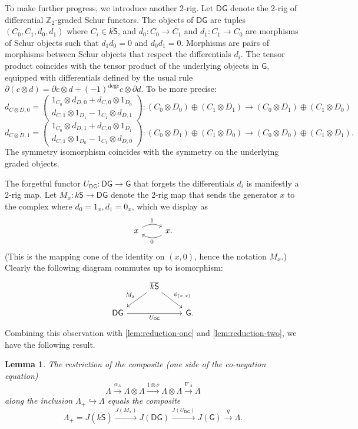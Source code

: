 \documentclass[12pt,reqno]{amsart}
\theoremstyle{plain}
\newtheorem{lem}[thm]{Lemma}
\theoremstyle{definition}
\theoremstyle{remark}
\newcommand{\maps}{\colon}
\newcommand{\category}[1]{\mathsf{#1}}
\renewcommand{\S}{\category S}
\newcommand{\Z}{\mathbb Z}
\newcommand{\G}{\mathsf{G}} %
\newcommand{\DG}{\mathsf{DG}} %
\newcommand{\ksbar}{\overline{k\S}}
\numberwithin{thm}{section}
\begin{document}
To make further progress, we introduce another 2-rig. Let $\DG$ denote the 2-rig of differential $\Z_2$-graded Schur functors. The objects of $\DG$ are tuples $(C_0, C_1, d_0, d_1)$ where $C_i \in \ksbar$, and $d_0 \maps C_0 \to C_1$ and $d_1 \maps C_1 \to C_0$ are morphisms of Schur objects such that $d_1 d_0=0$ and $d_0 d_1 = 0$. Morphisms are pairs of morphisms between Schur objects that respect the differentials $d_i$. The tensor product coincides with the tensor product of the underlying objects in $\G$, equipped with differentials defined by the usual rule $\partial(c \otimes d) = \partial c \otimes d + (-1)^{\mathrm{deg} c} c \otimes \partial d$. To be more precise: 
\[
d_{C \otimes D, 0} =\left( \begin{array}{c}
     1_{C_0} \otimes d_{D, 0} + d_{C, 0} \otimes 1_{D_0}  \\
     d_{C, 1} \otimes 1_{D_1} - 1_{C_1} \otimes d_{D, 1} 
\end{array}\right) \maps (C_0 \otimes D_0) \oplus (C_1 \otimes D_1) \to (C_0 \otimes D_1) \oplus (C_1 \otimes D_0)
\]
\[
d_{C \otimes D, 1} = \left( \begin{array}{c}
     1_{C_0} \otimes d_{D, 1} + d_{C, 0} \otimes 1_{D_1}  \\
     d_{C, 1} \otimes 1_{D_0} - 1_{C_1} \otimes d_{D, 0} 
\end{array}\right) \maps (C_0 \otimes D_1) \oplus (C_1 \otimes D_0) \to (C_0 \otimes D_0) \oplus (C_1 \otimes D_1).
\]
The symmetry isomorphism coincides with the symmetry on the underlying graded objects. 

The forgetful functor $U_{\DG} \maps \DG \to \G$ that forgets the differentials $d_i$ is manifestly a 2-rig map. Let $M_x \maps \ksbar \to \DG$ denote the 2-rig map that sends the generator $x$ to the complex where $d_0 = 1_x, d_1 = 0_x$, which we display as 
\[
\begin{tikzcd}
    x
    \arrow[r, bend left, "1"]
    &
    x.
    \arrow[l, bend left, "0"]
\end{tikzcd}\]
(This is the mapping cone of the identity on $(x, 0)$, hence the notation $M_x$.)  Clearly the following diagram commutes up to isomorphism:
\[
\begin{tikzcd}
    &
    \ksbar
    \arrow[dl, swap, "M_x"]
    \arrow[dr, "{\phi_{(x, x)}}"]
    \\
    \DG
    \arrow[rr, swap, "U_{\DG}"]
    &&
    \G.
\end{tikzcd}
\]
Combining this observation with \cref{lem:reduction-one} and \cref{lem:reduction-two}, we have the following result. 
\begin{lem}
\label{prop:reduction-three}
    The restriction of the composite (one side of the co-negation equation) 
    \[
    \Lambda \xrightarrow{\alpha_\Lambda} \Lambda \otimes \Lambda \xrightarrow{1 \otimes \nu} \Lambda \otimes \Lambda \xrightarrow{\nabla_\Lambda} \Lambda
    \]
    along the inclusion $\Lambda_+ \hookrightarrow \Lambda$ equals the composite 
    \[
    \Lambda_+ = J(\ksbar) \xrightarrow{J(M_x)} J(\DG) \xrightarrow{J(U_{\DG})} J(\G) \xrightarrow{q} \Lambda.
    \]
\end{lem}
\end{document}
